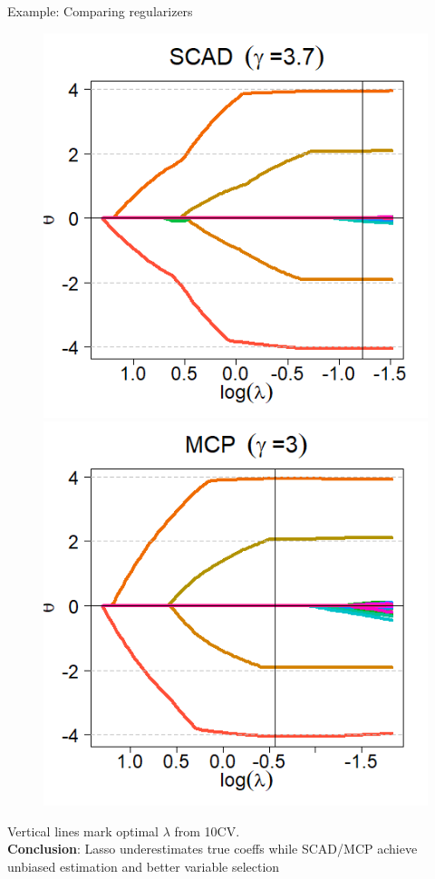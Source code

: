 \documentclass[11pt,compress,t,notes=noshow, xcolor=table]{beamer}
\begin{document}
\begin{vbframe}{Example: Comparing regularizers}
\begin{figure}[h]
\begin{minipage}{0.32\linewidth}
      \centerline{\includegraphics[width=\textwidth]{figure_man/other-pen-SCAD.png}}
    \end{minipage}
    \begin{minipage}{0.32\linewidth}
      \vspace{3pt}
      \centerline{\includegraphics[width=\textwidth]{figure_man/other-pen-MCP.png}}
    \end{minipage}
  \end{figure}
Vertical lines mark optimal $\lambda$ from 10CV.\\
\vspace{0.1cm}
\textbf{Conclusion}: Lasso underestimates true coeffs while SCAD/MCP achieve unbiased estimation and better variable selection


\end{vbframe}
\end{document}
